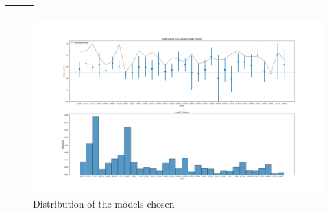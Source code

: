 \documentclass[
  12pt,
]{article}
\begin{document}
\begin{table}[ht]
\begin{centerbox}
\begin{threeparttable}
\begin{tabular}{l l l}
\hhline{}
\arrayrulecolor{black}
\end{tabular}
\end{threeparttable}\par\end{centerbox}

\end{table}
 

\begin{figure}

{\centering \includegraphics[width=0.65\linewidth]{../computed_objects/figures/model_choices_all} 

}

\caption{\label{modelChoicesAll} Distribution of the models chosen}\label{fig:modelChoicesAll}
\end{figure}

  
\end{document}
